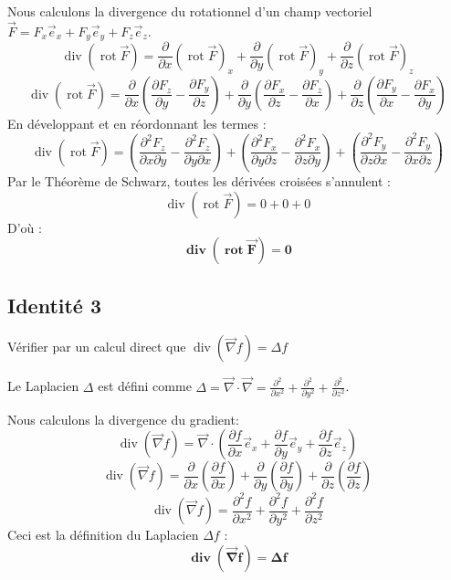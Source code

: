 \documentclass[french]{yLectureNote}
\renewcommand{\vec}{\overrightarrow}
\begin{document}
Nous calculons la divergence du rotationnel d'un champ vectoriel $\vec{F} = F_x \vec{e}_x + F_y \vec{e}_y + F_z \vec{e}_z$.
$$
\operatorname{div}(\operatorname{rot}\vec{F}) = \frac{\partial}{\partial x}(\operatorname{rot}\vec{F})_x + \frac{\partial}{\partial y}(\operatorname{rot}\vec{F})_y + \frac{\partial}{\partial z}(\operatorname{rot}\vec{F})_z
$$
$$
\operatorname{div}(\operatorname{rot}\vec{F}) = \frac{\partial}{\partial x}\left(\frac{\partial F_z}{\partial y} - \frac{\partial F_y}{\partial z}\right) + \frac{\partial}{\partial y}\left(\frac{\partial F_x}{\partial z} - \frac{\partial F_z}{\partial x}\right) + \frac{\partial}{\partial z}\left(\frac{\partial F_y}{\partial x} - \frac{\partial F_x}{\partial y}\right)
$$
En développant et en réordonnant les termes :
$$
\operatorname{div}(\operatorname{rot}\vec{F}) = \left(\frac{\partial^{2}F_z}{\partial x \partial y} - \frac{\partial^{2}F_z}{\partial y \partial x}\right) + \left(\frac{\partial^{2}F_x}{\partial y \partial z} - \frac{\partial^{2}F_x}{\partial z \partial y}\right) + \left(\frac{\partial^{2}F_y}{\partial z \partial x} - \frac{\partial^{2}F_y}{\partial x \partial z}\right)
$$
Par le Théorème de Schwarz, toutes les dérivées croisées s'annulent :
$$
\operatorname{div}(\operatorname{rot}\vec{F}) = 0 + 0 + 0
$$
D'où :
$$
\mathbf{\operatorname{div}(\operatorname{rot}\vec{F}) = 0}
$$
\subsection{Identité 3}
Vérifier par un calcul direct que $\operatorname{div}(\vec{\nabla}f)=\Delta f$

Le Laplacien $\Delta$ est défini comme $\Delta=\vec{\nabla}\cdot\vec{\nabla}=\frac{\partial^{2}}{\partial x^{2}}+\frac{\partial^{2}}{\partial y^{2}}+\frac{\partial^{2}}{\partial z^{2}}$.

Nous calculons la divergence du gradient:
$$
\operatorname{div}(\vec{\nabla}f) = \vec{\nabla} \cdot \left(\frac{\partial f}{\partial x}\vec{e}_{x} + \frac{\partial f}{\partial y}\vec{e}_{y} + \frac{\partial f}{\partial z}\vec{e}_{z}\right)
$$
$$
\operatorname{div}(\vec{\nabla}f) = \frac{\partial}{\partial x}\left(\frac{\partial f}{\partial x}\right) + \frac{\partial}{\partial y}\left(\frac{\partial f}{\partial y}\right) + \frac{\partial}{\partial z}\left(\frac{\partial f}{\partial z}\right)
$$
$$
\operatorname{div}(\vec{\nabla}f) = \frac{\partial^{2}f}{\partial x^{2}} + \frac{\partial^{2}f}{\partial y^{2}} + \frac{\partial^{2}f}{\partial z^{2}}
$$
Ceci est la définition du Laplacien $\Delta f$ :
$$
\mathbf{\operatorname{div}(\vec{\nabla}f) = \Delta f}
$$
\end{document}
